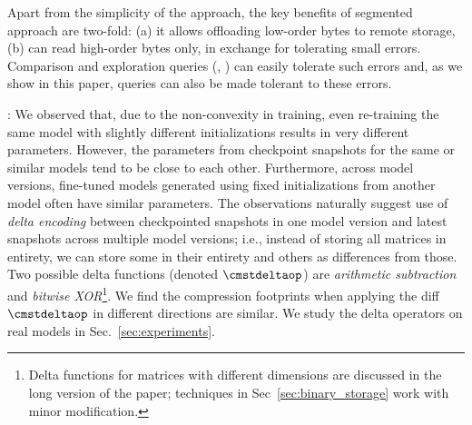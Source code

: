 \documentclass[conference]{IEEEtran}
\begin{document}
Apart from the simplicity of the approach, the key benefits of segmented approach are two-fold: (a) it allows offloading low-order bytes to remote storage, (b) \weightstore\queries can read high-order bytes only, in exchange for tolerating small errors.
Comparison and exploration queries (, ) can easily tolerate such errors and, as we show in this paper,  queries can also be made tolerant to these errors.




: 
We observed that, due to the non-convexity in training, even re-training the
same model with slightly different initializations results in very different
parameters. %
However, the parameters from checkpoint snapshots for the same
or similar models tend to be close to each other. 
Furthermore, across model versions, fine-tuned models generated using fixed
initializations from another model often have similar parameters. The
observations naturally suggest use of {\em delta encoding} between checkpointed snapshots
in one model version and latest snapshots across multiple model versions; i.e., instead of storing
all matrices in entirety, we can store some in their entirety and others as differences from those.
Two possible delta functions (denoted $\cmstdeltaop$) are {\em arithmetic subtraction} and {\em bitwise XOR}\footnote{
Delta functions for matrices with different dimensions are discussed in the long version of the paper; 
techniques in
Sec~\ref{sec:binary_storage} work with minor modification.}. %
We find the compression footprints when applying
the diff $\cmstdeltaop$ in different directions are similar.
We study the delta operators on real models in Sec.~\ref{sec:experiments}. 
\end{document}
